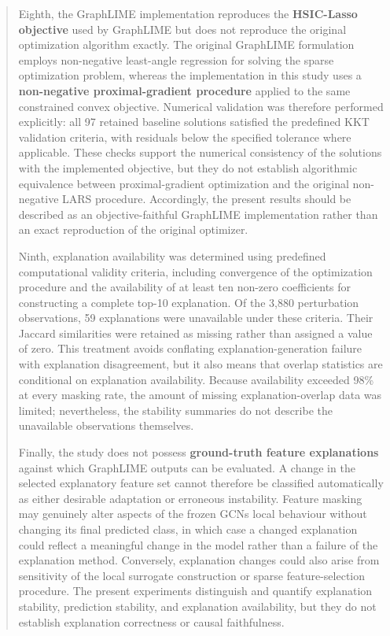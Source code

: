 \documentclass[a4paper]{article}
\begin{document}
\begin{quote}
Eighth, the GraphLIME implementation reproduces the \textbf{HSIC-Lasso
objective} used by GraphLIME but does not reproduce the original
optimization algorithm exactly. The original GraphLIME formulation
employs non-negative least-angle regression for solving the sparse
optimization problem, whereas the implementation in this study uses a
\textbf{non-negative proximal-gradient procedure} applied to the same
constrained convex objective. Numerical validation was therefore
performed explicitly: all 97 retained baseline solutions satisfied the
predefined KKT validation criteria, with residuals below the specified
tolerance where applicable. These checks support the numerical
consistency of the solutions with the implemented objective, but they do
not establish algorithmic equivalence between proximal-gradient
optimization and the original non-negative LARS procedure. Accordingly,
the present results should be described as an objective-faithful
GraphLIME implementation rather than an exact reproduction of the
original optimizer.

Ninth, explanation availability was determined using predefined
computational validity criteria, including convergence of the
optimization procedure and the availability of at least ten non-zero
coefficients for constructing a complete top-10 explanation. Of the
3,880 perturbation observations, 59 explanations were unavailable under
these criteria. Their Jaccard similarities were retained as missing
rather than assigned a value of zero. This treatment avoids conflating
explanation-generation failure with explanation disagreement, but it
also means that overlap statistics are conditional on explanation
availability. Because availability exceeded 98\% at every masking rate,
the amount of missing explanation-overlap data was limited;
nevertheless, the stability summaries do not describe the unavailable
observations themselves.

Finally, the study does not possess \textbf{ground-truth feature
explanations} against which GraphLIME outputs can be evaluated. A change
in the selected explanatory feature set cannot therefore be classified
automatically as either desirable adaptation or erroneous instability.
Feature masking may genuinely alter aspects of the frozen
GCN\textquotesingle s local behaviour without changing its final
predicted class, in which case a changed explanation could reflect a
meaningful change in the model rather than a failure of the explanation
method. Conversely, explanation changes could also arise from
sensitivity of the local surrogate construction or sparse
feature-selection procedure. The present experiments distinguish and
quantify explanation stability, prediction stability, and explanation
availability, but they do not establish explanation correctness or
causal faithfulness.


\end{quote}
\end{document}
